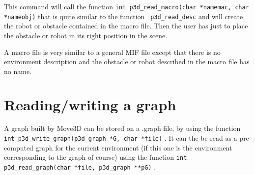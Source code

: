 This command will call the function {\tt int p3d\_read\_macro(char
*namemac, char *nameobj)} that is quite similar to the function {\tt
p3d\_read\_desc} and will create the robot or obstacle contained in
the macro file. Then the user has just to place the obstacle or robot
in its right position in the scene.

A macro file is very similar to a general MIF file except that there
is no environment description and the obstacle or robot described in
the macro file has no name.

\section{Reading/writing a graph}

A graph built by Move3D can be stored on a .graph file, by using the
function {\tt int p3d\_write\_graph(p3d\_graph *G, char *file)}
 . It
can the be read as a pre-computed graph for the current environment
(if this one is the environment corresponding to the graph of course)
using the function {\tt int p3d\_read\_graph(char *file, p3d\_graph
**pG)} .

